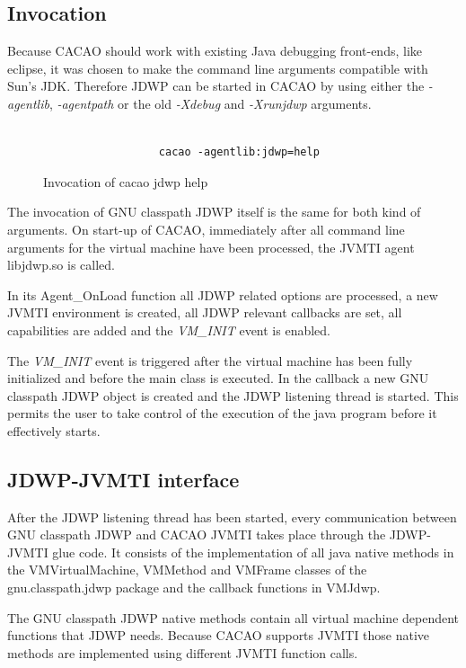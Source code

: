 \subsection{Invocation} %
Because CACAO should work with existing Java debugging front-ends, like eclipse\cite{eclipse}, it was chosen to make the command line arguments compatible with Sun's JDK. Therefore JDWP can be started in CACAO by using either the \textit{-agentlib}, \textit{-agentpath} or the old \textit{-Xdebug} and \textit{-Xrunjdwp} arguments. 

\begin{figure}[h]
\begin{verbatim}

                  cacao -agentlib:jdwp=help
\end{verbatim}
\caption{Invocation of cacao jdwp help}
\end{figure}

The invocation of GNU classpath JDWP itself is the same for both kind of arguments. On start-up of CACAO, immediately after all command line arguments for the virtual machine have been processed, the JVMTI agent libjdwp.so is called.

In its Agent\_OnLoad function all JDWP related options are processed, a new JVMTI environment is created, all JDWP relevant callbacks are set, all capabilities are added and the \textit{VM\_INIT} event is enabled. 

The \textit{VM\_INIT} event is triggered after the virtual machine has been fully initialized and before the main class is executed. In the callback a new GNU classpath JDWP object is created and the JDWP listening thread is started. This permits the user to take control of the execution of the java program before it effectively starts.

\subsection{JDWP-JVMTI interface} %
After the JDWP listening thread has been started, every communication between GNU classpath JDWP and CACAO JVMTI takes place through the JDWP-JVMTI glue code. It consists of the implementation of all java native methods in the VMVirtualMachine, VMMethod and VMFrame classes of the gnu.classpath.jdwp package and the callback functions in VMJdwp.

The GNU classpath JDWP native methods contain all virtual machine dependent functions that JDWP needs. Because CACAO supports JVMTI those native methods are implemented using different JVMTI function calls.

